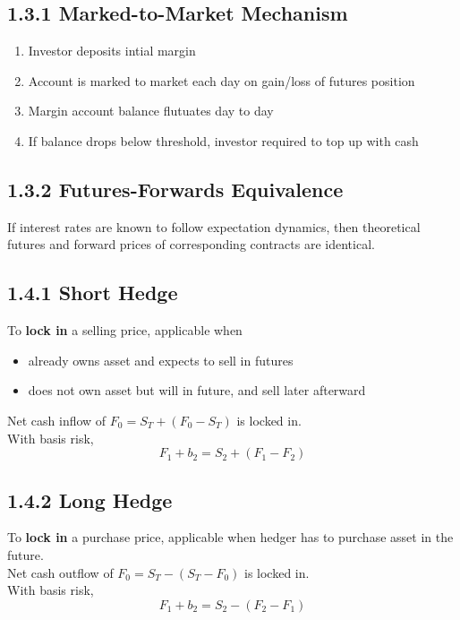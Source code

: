 \subsection*{1.3.1 Marked-to-Market Mechanism}
\begin{enumerate}
    \item Investor deposits intial margin
    \item Account is marked to market each day on 
    gain/loss of futures position
    \item Margin account balance flutuates day to day
    \item If balance drops below threshold, 
    investor required to top up with cash
\end{enumerate}

\subsection*{1.3.2 Futures-Forwards Equivalence}
If interest rates are known to follow expectation dynamics,
then theoretical futures and forward prices of
corresponding contracts are identical.

\subsection*{1.4.1 Short Hedge}
To \textbf{lock in} a selling price, applicable when
\begin{itemize}
    \item already owns asset and expects to sell in futures
    \item does not own asset but will in future, 
    and sell later afterward
\end{itemize}
Net cash inflow of $F_0=S_T+(F_0-S_T)$ is locked in.\\
With basis risk,
\[F_1+b_2=S_2+(F_1-F_2)\]

\subsection*{1.4.2 Long Hedge}
To \textbf{lock in} a purchase price, applicable when hedger
has to purchase asset in the future.\\
Net cash outflow of $F_0=S_T-(S_T-F_0)$ is locked in.\\
With basis risk,
\[F_1+b_2=S_2-(F_2-F_1)\]

